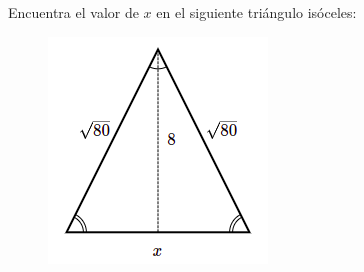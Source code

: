 Encuentra el valor de $x$ en el siguiente triángulo isóceles:

\begin{figure}[H]
    \centering
    \includegraphics[width=0.25\linewidth]{../images/pitagoras9.png}
    \caption{}
    \label{fig:pitagoras9}
\end{figure}
